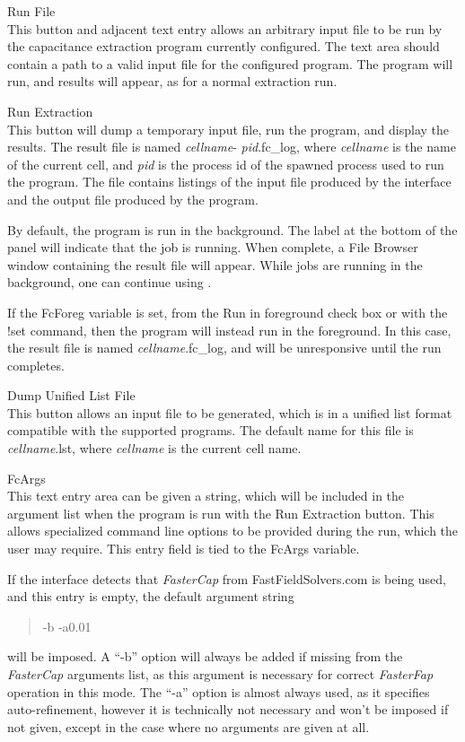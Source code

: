 \begin{description}
\item{\cb Run File}\\
This button and adjacent text entry allows an arbitrary input file to
be run by the capacitance extraction program currently configured. 
The text area should contain a path to a valid input file for the
configured program.  The program will run, and results will appear, as
for a normal extraction run.

\item{\cb Run Extraction}\\
This button will dump a temporary input file, run the program, and
display the results.  The result file is named {\it cellname\/}-{\it
pid\/}{\vt .fc\_log}, where {\it cellname} is the name of the current
cell, and {\it pid} is the process id of the spawned process used to
run the program.  The file contains listings of the input file
produced by the interface and the output file produced by the program.

By default, the program is run in the background.  The label at the
bottom of the panel will indicate that the job is running.  When
complete, a {\cb File Browser} window containing the result file will
appear.  While jobs are running in the background, one can continue
using {\Xic}.

If the {\et FcForeg} variable is set, from the {\cb Run in foreground}
check box or with the {\cb !set} command, then the program will
instead run in the foreground.  In this case, the result file is named
{\it cellname\/}{\vt .fc\_log}, and {\Xic} will be unresponsive until
the run completes.

\item{\cb Dump Unified List File}\\
This button allows an input file to be generated, which is in a
unified list format compatible with the supported programs.  The
default name for this file is {\it cellname\/}{\vt .lst}, where {\it
cellname} is the current cell name.

\item{\cb FcArgs}\\
This text entry area can be given a string, which will be included in
the argument list when the program is run with the {\cb Run
Extraction} button.  This allows specialized command line options to
be provided during the run, which the user may require.  This entry
field is tied to the {\et FcArgs} variable.

If the interface detects that {\it FasterCap} from {\vt
FastFieldSolvers.com} is being used, and this entry is empty, the
default argument string
\begin{quote}\vt
-b -a0.01
\end{quote}
will be imposed.  A ``{\vt -b}'' option will always be added if
missing from the {\it FasterCap} arguments list, as this argument is
necessary for correct {\it FasterFap} operation in this mode.  The
``{\vt -a}'' option is almost always used, as it specifies
auto-refinement, however it is technically not necessary and won't be
imposed if not given, except in the case where no arguments are given
at all.


\end{description}
